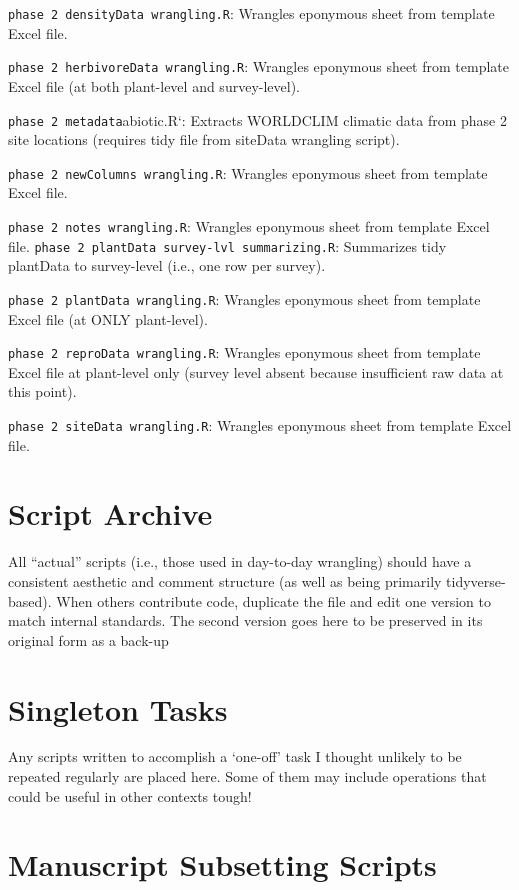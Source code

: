 \documentclass[
  letterpaper,
  oneside,
  open=any]{scrbook}
\begin{document}
\texttt{phase\ 2\ densityData\ wrangling.R}: Wrangles eponymous sheet
from template Excel file.

\texttt{phase\ 2\ herbivoreData\ wrangling.R}: Wrangles eponymous sheet
from template Excel file (at both plant-level and survey-level).

\texttt{phase\ 2\ metadata}abiotic.R`: Extracts WORLDCLIM climatic data
from phase 2 site locations (requires tidy file from siteData wrangling
script).

\texttt{phase\ 2\ newColumns\ wrangling.R}: Wrangles eponymous sheet
from template Excel file.

\texttt{phase\ 2\ notes\ wrangling.R}: Wrangles eponymous sheet from
template Excel file.
\texttt{phase\ 2\ plantData\ survey-lvl\ summarizing.R}: Summarizes tidy
plantData to survey-level (i.e., one row per survey).

\texttt{phase\ 2\ plantData\ wrangling.R}: Wrangles eponymous sheet from
template Excel file (at ONLY plant-level).

\texttt{phase\ 2\ reproData\ wrangling.R}: Wrangles eponymous sheet from
template Excel file at plant-level only (survey level absent because
insufficient raw data at this point).

\texttt{phase\ 2\ siteData\ wrangling.R}: Wrangles eponymous sheet from
template Excel file.

\section{Script Archive}\label{script-archive}

All ``actual'' scripts (i.e., those used in day-to-day wrangling) should
have a consistent aesthetic and comment structure (as well as being
primarily tidyverse-based). When others contribute code, duplicate the
file and edit one version to match internal standards. The second
version goes here to be preserved in its original form as a back-up

\section{Singleton Tasks}\label{singleton-tasks}

Any scripts written to accomplish a `one-off' task I thought unlikely to
be repeated regularly are placed here. Some of them may include
operations that could be useful in other contexts tough!

\section{Manuscript Subsetting
Scripts}\label{manuscript-subsetting-scripts}
\end{document}
